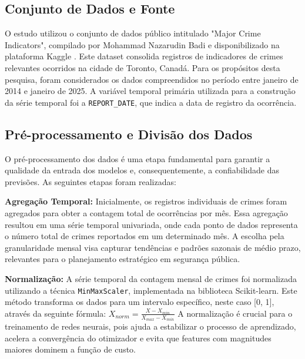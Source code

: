 \documentclass[conference]{IEEEtran}
\begin{document}
\subsection{Conjunto de Dados e Fonte}
O estudo utilizou o conjunto de dados público intitulado "Major Crime Indicators", compilado por Mohammad Nazarudin Badi e disponibilizado na plataforma Kaggle \cite{b7}. Este dataset consolida registros de indicadores de crimes relevantes ocorridos na cidade de Toronto, Canadá. Para os propósitos desta pesquisa, foram considerados os dados compreendidos no período entre janeiro de 2014 e janeiro de 2025. A variável temporal primária utilizada para a construção da série temporal foi a \texttt{REPORT\_DATE}, que indica a data de registro da ocorrência.

\subsection{Pré-processamento e Divisão dos Dados}
O pré-processamento dos dados é uma etapa fundamental para garantir a qualidade da entrada dos modelos e, consequentemente, a confiabilidade das previsões. As seguintes etapas foram realizadas:

\textbf{Agregação Temporal:} Inicialmente, os registros individuais de crimes foram agregados para obter a contagem total de ocorrências por mês. Essa agregação resultou em uma série temporal univariada, onde cada ponto de dados representa o número total de crimes reportados em um determinado mês. A escolha pela granularidade mensal visa capturar tendências e padrões sazonais de médio prazo, relevantes para o planejamento estratégico em segurança pública.

\textbf{Normalização:} A série temporal da contagem mensal de crimes foi normalizada utilizando a técnica \texttt{MinMaxScaler}, implementada na biblioteca Scikit-learn. Este método transforma os dados para um intervalo específico, neste caso [0, 1], através da seguinte fórmula:
$ X_{norm} = \frac{X - X_{min}}{X_{max} - X_{min}} $
A normalização é crucial para o treinamento de redes neurais, pois ajuda a estabilizar o processo de aprendizado, acelera a convergência do otimizador e evita que features com magnitudes maiores dominem a função de custo.
\end{document}
